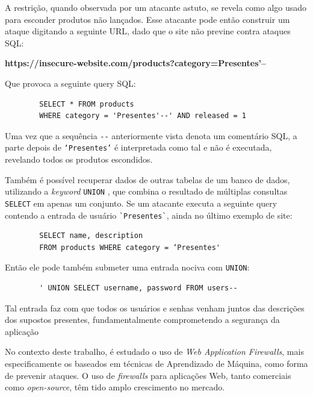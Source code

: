 \begin{alineas}
    A restrição, quando observada por um atacante astuto, se revela como algo usado para esconder produtos não lançados. Esse atacante pode então construir um ataque digitando a seguinte URL, dado que o site não previne contra ataques SQL:
        
    \textbf{https://insecure-website.com/products?category=Presentes’--}
    
    Que provoca a seguinte query SQL:
    
    \begin{verbatim}
        SELECT * FROM products 
        WHERE category = 'Presentes'--' AND released = 1 
    \end{verbatim}
    
     Uma vez que a sequência \verb+--+ anteriormente vista denota um comentário SQL, a parte depois de 
    \verb+‘Presentes’+ é interpretada como tal e não é executada, revelando todos os produtos escondidos.

    \item
    Também é possível recuperar dados de outras tabelas de um banco de dados, utilizando a \textit{keyword} \verb+UNION+ \cite{mysql_union}, que combina o resultado de múltiplas consultas \verb+SELECT+ em apenas um conjunto. Se um atacante executa a seguinte query contendo a entrada de usuário \verb+`Presentes`+, ainda no último exemplo de site:
    
    \begin{verbatim}
        SELECT name, description
        FROM products WHERE category = ‘Presentes'
    \end{verbatim}
    
    Então ele pode também submeter uma entrada nociva com \verb+UNION+:
    
    \begin{verbatim}
        ' UNION SELECT username, password FROM users--
    \end{verbatim}
        
    Tal entrada faz com que todos os usuários e senhas venham juntos das descrições dos supostos presentes, fundamentalmente comprometendo a segurança da aplicação

\end{alineas}


No contexto deste trabalho, é estudado o uso de \textit{Web Application Firewalls}, mais especificamente os baseados em técnicas de Aprendizado de Máquina, como forma de prevenir ataques. O uso de \textit{firewalls} para aplicações Web, tanto comerciais como \textit{open-source}, têm tido amplo  crescimento no mercado.

